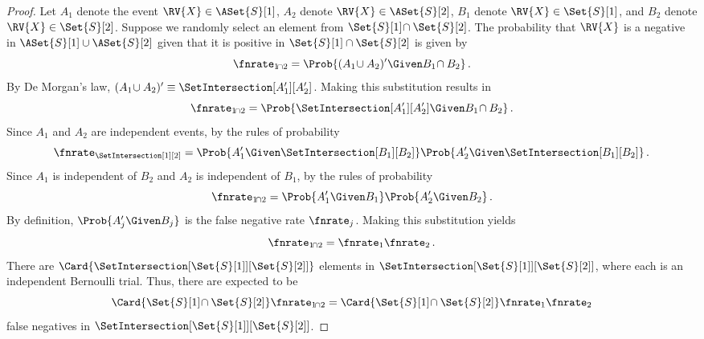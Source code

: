 \documentclass[ ../main.tex]{subfiles}
\begin{document}
{\begin{proof}
Let $A_1$ denote the event $\RV{X} \in \ASet{S}[1]$, $A_2$ denote $\RV{X} \in \ASet{S}[2]$, $B_1$ denote $\RV{X} \in \Set{S}[1]$, and $B_2$ denote $\RV{X} \in \Set{S}[2]$. Suppose we randomly select an element from $\Set{S}[1] \! \cap \Set{S}[2]$. The probability that $\RV{X}$ is a negative in $\ASet{S}[1] \cup \ASet{S}[2]$ given that it is positive in $\Set{S}[1] \cap \Set{S}[2]$ is given by
\begin{equation}
    \fnrate_{1 \! \cap 2} = \Prob{(A_1 \! \cup A_2)' \Given B_1 \! \cap B_2}\,.
\end{equation}
By De Morgan's law, $(A_1 \! \cup A_2)' \equiv \SetIntersection[A_1'][A_2']$. Making this substitution results in
\begin{equation}
    \fnrate_{1 \! \cap 2} = \Prob{\SetIntersection[A_1'][A_2'] \Given B_1 \! \cap B_2}\,.
\end{equation}
Since $A_1$ and $A_2$ are independent events, by the rules of probability \begin{equation}
    \fnrate_{\SetIntersection[1][2]} = \Prob{A_1' \Given \SetIntersection[B_1][B_2]} \Prob{A_2' \Given \SetIntersection[B_1][B_2]}\,.
\end{equation}
Since $A_1$ is independent of $B_2$ and $A_2$ is independent of $B_1$, by the rules of probability
\begin{equation}
    \fnrate_{1 \! \cap 2} = \Prob{A_1' \Given B_1} \Prob{A_2' \Given B_2}\,.
\end{equation}
By definition, $\Prob{A_j' \Given B_j}$ is the false negative rate $\fnrate_j$. Making this substitution yields
\begin{equation}
    \fnrate_{1 \! \cap 2} = \fnrate_1 \fnrate_2\,.
\end{equation}
There are $\Card{\SetIntersection[\Set{S}[1]][\Set{S}[2]]}$ elements in $\SetIntersection[\Set{S}[1]][\Set{S}[2]]$, where each is an independent Bernoulli trial. Thus, there are expected to be
\begin{equation}
\label{eq:proof_union_fn_1}
    \Card{\Set{S}[1] \! \cap \Set{S}[2]} \fnrate_{1 \! \cap 2} = \Card{\Set{S}[1] \! \cap \Set{S}[2]} \fnrate_1 \fnrate_2
\end{equation}
false negatives in $\SetIntersection[\Set{S}[1]][\Set{S}[2]]$.


\end{proof}}
\end{document}
